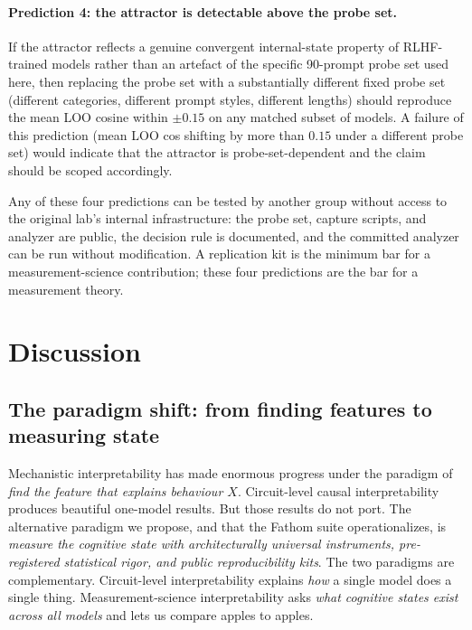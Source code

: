 \documentclass[11pt,letterpaper]{article}
\begin{document}
\paragraph{Prediction 4: the attractor is detectable above the probe
set.} If the attractor reflects a genuine convergent internal-state
property of RLHF-trained models rather than an artefact of the specific
90-prompt probe set used here, then replacing the probe set with a
substantially different fixed probe set (different categories, different
prompt styles, different lengths) should reproduce the mean LOO cosine
within $\pm 0.15$ on any matched subset of models. A failure of this
prediction (mean LOO cos shifting by more than $0.15$ under a different
probe set) would indicate that the attractor is probe-set-dependent and
the claim should be scoped accordingly.

Any of these four predictions can be tested by another group without
access to the original lab's internal infrastructure: the probe set,
capture scripts, and analyzer are public, the decision rule is
documented, and the committed analyzer can be run without modification.
A replication kit is the minimum bar for a measurement-science
contribution; these four predictions are the bar for a measurement
theory.

\section{Discussion}
\label{sec:discussion}

\subsection{The paradigm shift: from finding features to measuring state}

Mechanistic interpretability has made enormous progress under the paradigm
of \emph{find the feature that explains behaviour $X$}. Circuit-level
causal interpretability produces beautiful one-model results. But those
results do not port. The alternative paradigm we propose, and that the
Fathom suite operationalizes, is \emph{measure the cognitive state with
architecturally universal instruments, pre-registered statistical rigor,
and public reproducibility kits}. The two paradigms are complementary.
Circuit-level interpretability explains \emph{how} a single model does a
single thing. Measurement-science interpretability asks \emph{what cognitive
states exist across all models} and lets us compare apples to apples.
\end{document}
